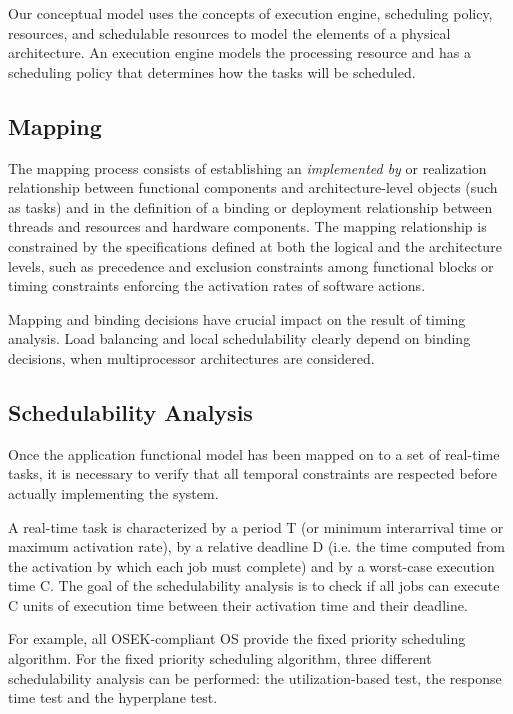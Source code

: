 Our conceptual model uses the concepts of execution engine, scheduling
policy, resources, and schedulable resources to model the elements
of a physical architecture. An execution engine models the processing
resource and has a scheduling policy that determines how the tasks
will be scheduled. 


\subsection{Mapping}
\label{sub:Mapping}

The mapping process consists of establishing an \emph{implemented by}
or realization relationship between functional components and
architecture-level objects (such as tasks) and in the definition of a
binding or deployment relationship between threads and resources and
hardware components. The mapping relationship is constrained by the
specifications defined at both the logical and the architecture
levels, such as precedence and exclusion constraints among functional
blocks or timing constraints enforcing the activation rates of
software actions.

Mapping and binding decisions have crucial impact on the result of
timing analysis. Load balancing and local schedulability clearly
depend on binding decisions, when multiprocessor architectures are
considered.


\subsection{Schedulability Analysis}
\label{sub:Schedulability-Analysis}

Once the application functional model has been mapped on to a set of
real-time tasks, it is necessary to verify that all temporal
constraints are respected before actually implementing the system.

A real-time task is characterized by a period T (or minimum
interarrival time or maximum activation rate), by a relative deadline
D (i.e. the time computed from the activation by which each job must
complete) and by a worst-case execution time C. The goal of the
schedulability analysis is to check if all jobs can execute C units of
execution time between their activation time and their deadline.

For example, all OSEK-compliant OS provide the fixed priority
scheduling algorithm. For the fixed priority scheduling algorithm,
three different schedulability analysis can be performed: the
utilization-based test, the response time test and the hyperplane
test.

